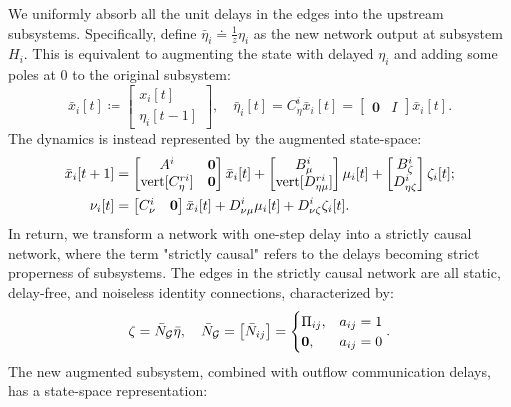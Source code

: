 We uniformly absorb all the unit delays in the edges into the upstream subsystems. Specifically, define \(\bar{\eta}_i \doteq \frac{1}{z} {\eta}_i\) as the new network output at subsystem \(H_i\).
This is equivalent to augmenting the state with delayed \(\eta_i\) and adding some poles at \(0\) to the original subsystem:
\[
\bar{x}_i[t] \coloneqq
\begin{bmatrix}
    x_i[t] \\
    \eta_i[t - 1]
\end{bmatrix}, \quad \bar{\eta}_i[t]= C_\eta^{i}\bar{x}_i[t] = \begin{bmatrix}
    \mathbf{0} & I
\end{bmatrix}\bar{x}_i[t].
\]
The dynamics is instead represented by the augmented state-space:
\begin{equation*}
\begin{split}
\bar{x}_i[t + 1] &= \begin{bmatrix}
A^i & \mathbf{0} \\
{\mathrm{vert}}[C_\eta^{ri}] & \mathbf{0}
\end{bmatrix}\bar{x}_i[t]
+ \begin{bmatrix}
B_\mu^i \\
{\mathrm{vert}}[D_{\eta \mu}^{ri}]
\end{bmatrix} \mu_i[t]
+ \begin{bmatrix}
B_{\zeta}^i \\
D_{\eta\zeta}^{i}
\end{bmatrix} \zeta_i[t];\\
\nu_i[t] & = 
\begin{bmatrix}
    C_{\nu}^i & \mathbf{0}
\end{bmatrix}
\bar{x}_i[t] + D_{\nu\mu}^i \mu_i[t] + D_{\nu\zeta}^{i} \zeta_{i}[t].
\end{split}
\end{equation*}
In return, we transform a network with one-step delay into a strictly causal network, where the term "strictly causal" refers to the delays becoming strict properness of subsystems. The edges in the strictly causal network are all static, delay-free, and noiseless identity connections, characterized by:
\[
\zeta = \bar{N}_{\cal G} \bar{\eta}, \quad 
\bar{N}_{\cal G} = \left[\bar{N}_{ij}\right] = \begin{cases}
\Pi_{ij}, & a_{ij} = 1\\
\mathbf{0}, & a_{ij} = 0 
\end{cases}.
\]
The new augmented subsystem, combined with outflow communication delays, has a state-space representation:
